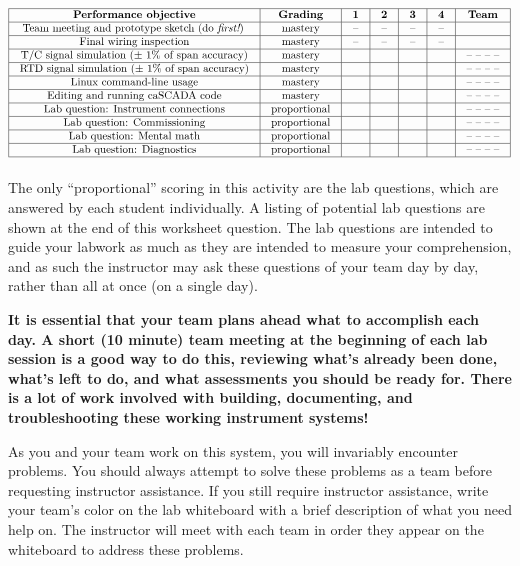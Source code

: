 $$\vbox{\offinterlineskip
\halign{\strut
\vrule \quad\hfil # \ \hfil & 
\vrule \quad\hfil # \ \hfil & 
\vrule \quad\hfil # \ \hfil & 
\vrule \quad\hfil # \ \hfil & 
\vrule \quad\hfil # \ \hfil & 
\vrule \quad\hfil # \ \hfil & 
\vrule \quad\hfil # \ \hfil \vrule \cr
\noalign{\hrule}
%
{\bf Performance objective} & {\bf Grading} & {\bf 1} & {\bf 2} & {\bf 3} & {\bf 4} & {\bf Team} \cr
%
\noalign{\hrule}
%
Team meeting and prototype sketch (do {\it first!}) & mastery & -- & -- & -- & -- & \cr
%
\noalign{\hrule}
%
Final wiring inspection & mastery & -- & -- & -- & -- &  \cr
%
\noalign{\hrule}
%
T/C signal simulation ($\pm$ 1\% of span accuracy) & mastery &  &  &  &  & -- -- -- -- \cr
%
\noalign{\hrule}
%
RTD signal simulation ($\pm$ 1\% of span accuracy) & mastery &  &  &  &  & -- -- -- -- \cr
%
\noalign{\hrule}
%
Linux command-line usage & mastery &  &  &  &  & -- -- -- -- \cr
%
\noalign{\hrule}
%
Editing and running caSCADA code & mastery &  &  &  &  & -- -- -- -- \cr
%
\noalign{\hrule}
%
Lab question: Instrument connections & proportional &  &  &  &  & -- -- -- -- \cr
%
\noalign{\hrule}
%
Lab question: Commissioning & proportional &  &  &  &  & -- -- -- -- \cr
%
\noalign{\hrule}
%
Lab question: Mental math & proportional &  &  &  &  & -- -- -- -- \cr
%
\noalign{\hrule}
%
Lab question: Diagnostics & proportional &  &  &  &  & -- -- -- -- \cr
%
\noalign{\hrule}
} %
}$$ %

The only ``proportional'' scoring in this activity are the lab questions, which are answered by each student individually.  A listing of potential lab questions are shown at the end of this worksheet question.  The lab questions are intended to guide your labwork as much as they are intended to measure your comprehension, and as such the instructor may ask these questions of your team day by day, rather than all at once (on a single day).

\vskip 10pt

{\bf It is essential that your team plans ahead what to accomplish each day.  A short (10 minute) team meeting at the beginning of each lab session is a good way to do this, reviewing what's already been done, what's left to do, and what assessments you should be ready for.  There is a lot of work involved with building, documenting, and troubleshooting these working instrument systems!}

As you and your team work on this system, you will invariably encounter problems.  You should always attempt to solve these problems as a team before requesting instructor assistance.  If you still require instructor assistance, write your team's color on the lab whiteboard with a brief description of what you need help on.  The instructor will meet with each team in order they appear on the whiteboard to address these problems.



